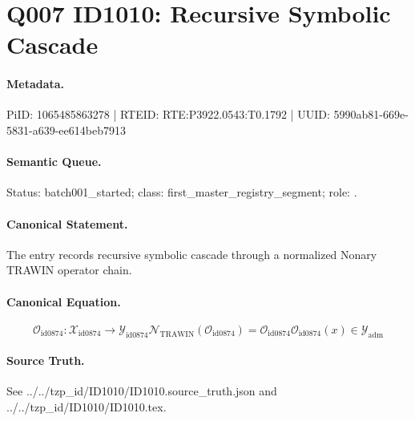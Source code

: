 \section*{Q007 ID1010: Recursive Symbolic Cascade}
\paragraph{Metadata.}
PiID: 1065485863278 | RTEID: RTE:P3922.0543:T0.1792 | UUID: 5990ab81-669e-5831-a639-ee614beb7913

\paragraph{Semantic Queue.}
Status: batch001\_started; class: first\_master\_registry\_segment; role: .

\paragraph{Canonical Statement.}
The entry records recursive symbolic cascade through a normalized Nonary TRAWIN operator chain.

\paragraph{Canonical Equation.}
\[
\mathcal{O}_{\mathrm{id0874}}:\mathcal{X}_{\mathrm{id0874}}\longrightarrow\mathcal{Y}_{\mathrm{id0874}} \mathcal{N}_{\mathrm{TRAWIN}}(\mathcal{O}_{\mathrm{id0874}})=\mathcal{O}_{\mathrm{id0874}} \mathcal{O}_{\mathrm{id0874}}(x)\in\mathcal{Y}_{\mathrm{adm}}
\]

\paragraph{Source Truth.}
See ../../tzp\_id/ID1010/ID1010.source\_truth.json and ../../tzp\_id/ID1010/ID1010.tex.
